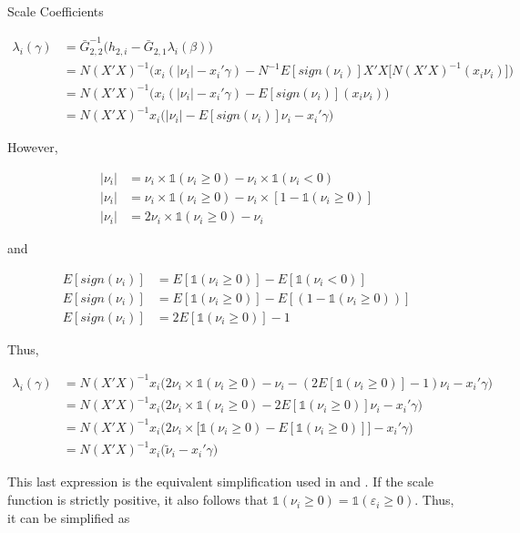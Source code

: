 \documentclass[
  12pt,
  oneside]{article}
\begin{document}
Scale Coefficients

\[\begin{aligned}
\lambda_i(\gamma)&=\bar G_{2,2}^{-1}\Big(h_{2,i}-\bar G_{2,1} \lambda_i(\beta)\Big) \\
&=N (X'X)^{-1} \Big(x_i(|\nu_i|-x_i' \gamma) 
- N^{-1} E[sign(\nu_i)] X'X \big[ N (X'X)^{-1}(x_i \nu_i) \big] \Big) \\
&=N (X'X)^{-1} \Big(x_i(|\nu_i|-x_i' \gamma) - E[sign(\nu_i)] (x_i \nu_i)  \Big) \\
&=N (X'X)^{-1} x_i \Big( |\nu_i| - E[sign(\nu_i)] \nu_i -x_i' \gamma \Big) 
\end{aligned}
\]

However,

\[\begin{aligned}
|\nu_i| &= \nu_i \times \mathbb{1}(\nu_i \geq 0) - \nu_i \times \mathbb{1}(\nu_i < 0) \\
|\nu_i| &= \nu_i \times \mathbb{1}(\nu_i \geq 0) - \nu_i \times [1-\mathbb{1}(\nu_i \geq 0)] \\
|\nu_i| &= 2 \nu_i \times \mathbb{1}(\nu_i \geq 0) - \nu_i  
\end{aligned}
\]

and

\[\begin{aligned}
E[sign(\nu_i)] &= E[\mathbb{1}(\nu_i \geq 0)] - E[\mathbb{1}(\nu_i < 0)] \\
E[sign(\nu_i)] &= E[\mathbb{1}(\nu_i \geq 0)] - E[(1-\mathbb{1}(\nu_i \geq 0))] \\
E[sign(\nu_i)] &= 2 E[\mathbb{1}(\nu_i \geq 0)] - 1
\end{aligned}
\]

Thus,

\[\begin{aligned}
\lambda_i(\gamma) &= N(X'X)^{-1} x_i   \Big( 2 \nu_i \times \mathbb{1}(\nu_i \geq 0) - \nu_i  - ( 2 E[\mathbb{1}(\nu_i \geq 0)] - 1) \nu_i -x_i' \gamma \Big) \\
  &= N(X'X)^{-1} x_i   \Big( 2 \nu_i \times \mathbb{1}(\nu_i \geq 0) -  2 E[\mathbb{1}(\nu_i \geq 0)] \nu_i -x_i' \gamma \Big) \\
  &= N(X'X)^{-1} x_i   \Big( 2 \nu_i \times \big[ \mathbb{1}(\nu_i \geq 0) -  E[\mathbb{1}(\nu_i \geq 0)] \big] -x_i'\gamma \Big) \\
  &= N(X'X)^{-1} x_i   \Big( \tilde \nu_i -x_i' 
  \gamma \Big)
\end{aligned}
\]

This last expression is the equivalent simplification used in
\citet{mss2019} and \citet{im2000}. If the scale function is strictly
positive, it also follows that
\(\mathbb{1}(\nu_i \geq 0)= \mathbb{1}(\varepsilon_i \geq 0)\). Thus, it
can be simplified as
\end{document}
